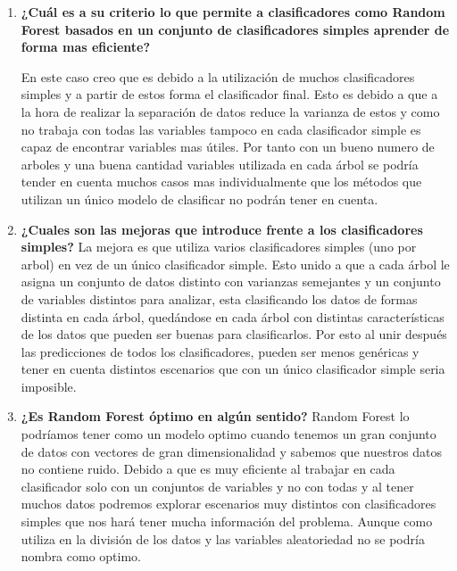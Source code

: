 \documentclass[titlepage]{article}
\begin{document}
\begin{enumerate}
	\item \textbf{¿Cuál es a su criterio lo que permite a clasificadores como Random Forest basados en un conjunto de clasificadores simples aprender de forma mas eficiente?}
	
	En este caso creo que es debido a la utilización de muchos clasificadores simples y a partir de estos forma el clasificador final. Esto es debido a que a la hora de realizar la separación de datos reduce la varianza de estos y como no trabaja con todas las variables tampoco en cada clasificador simple es capaz de encontrar variables mas útiles. Por tanto con un bueno numero de arboles y una buena cantidad variables utilizada en cada árbol se podría tender en cuenta muchos casos mas individualmente que los métodos que utilizan un único modelo de clasificar no podrán tener en cuenta.
	
	\item \textbf{¿Cuales son las mejoras que introduce frente a los clasificadores simples?}
	La mejora es que utiliza varios clasificadores simples (uno por arbol) en vez de un único clasificador simple. Esto unido a que a cada árbol le asigna un conjunto de datos distinto con varianzas semejantes y un conjunto de variables distintos para analizar, esta clasificando los datos de formas distinta en cada árbol, quedándose en cada árbol con distintas características de los datos que pueden ser buenas para clasificarlos. Por esto al unir después las predicciones de todos los clasificadores, pueden ser menos genéricas y tener en cuenta distintos escenarios que con un único clasificador simple seria imposible.
	
	\item \textbf{¿Es Random Forest óptimo en algún sentido?}
	Random Forest lo podríamos tener como un modelo optimo cuando tenemos un gran conjunto de datos con vectores de gran dimensionalidad y sabemos que nuestros datos no contiene ruido. Debido a que es muy eficiente al trabajar en cada clasificador solo con un conjuntos de variables y no con todas y al tener muchos datos podremos explorar escenarios muy distintos con clasificadores simples que nos hará tener mucha información del problema. Aunque como utiliza en la división de los datos y las variables aleatoriedad no se podría nombra como optimo.
	
\end{enumerate}
\end{document}
